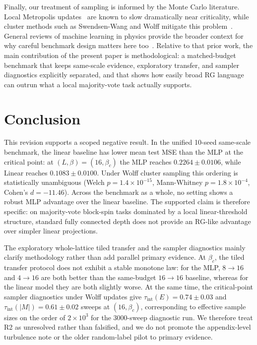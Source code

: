 \documentclass[12pt,a4paper]{memoir}
\begin{document}
Finally, our treatment of sampling is informed by the Monte Carlo literature.
Local Metropolis updates~\citep{metropolis1953,hastings1970} are known to slow
dramatically near criticality, while cluster methods such as Swendsen-Wang and
Wolff mitigate this problem~\citep{swendsen1987,wolff1989,sokal1997,
newman1999,binder2010}.  General reviews of machine learning in physics provide
the broader context for why careful benchmark design matters here
too~\citep{carleo2019,mehta2019}.  Relative to that prior work, the main
contribution of the present paper is methodological: a matched-budget benchmark
that keeps same-scale evidence, exploratory transfer, and sampler diagnostics
explicitly separated, and that shows how easily broad RG language can outrun
what a local majority-vote task actually supports.

\section{Conclusion}
\label{sec:conclusion}

This revision supports a scoped negative result.  In the unified 10-seed
same-scale benchmark, the linear baseline has lower mean test MSE than the MLP
at the critical point: at $(L,\beta)=(16,\beta_c)$ the MLP reaches
$0.2264 \pm 0.0106$, while Linear reaches $0.1083 \pm 0.0100$.  Under Wolff
cluster sampling this ordering is statistically unambiguous (Welch
$p=1.4\times10^{-15}$, Mann-Whitney $p=1.8\times10^{-4}$, Cohen's
$d=-11.46$).  Across the benchmark as a whole, no setting
shows a robust MLP advantage over the linear baseline.  The supported claim is
therefore specific: on majority-vote block-spin tasks dominated by a local
linear-threshold structure, standard fully connected depth does not provide an
RG-like advantage over simpler linear projections.

The exploratory whole-lattice tiled transfer and the sampler diagnostics mainly
clarify methodology rather than add parallel primary evidence.  At $\beta_c$,
the tiled transfer protocol does not exhibit a stable monotone law: for the
MLP, $8\to16$ and $4\to16$ are both better than the same-budget $16\to16$
baseline, whereas for the linear model they are both slightly worse.  At the
same time, the critical-point sampler diagnostics under Wolff updates give
$\tau_{\mathrm{int}}(E)=0.74 \pm 0.03$ and
$\tau_{\mathrm{int}}(|M|)=0.61 \pm 0.02$ sweeps at $(16,\beta_c)$, corresponding
to effective sample sizes on the order of $2\times10^3$ for the 3000-sweep
diagnostic run.  We therefore treat R2 as unresolved rather than falsified, and
we do not promote
the appendix-level turbulence note or the older random-label pilot to primary
evidence.
\end{document}
